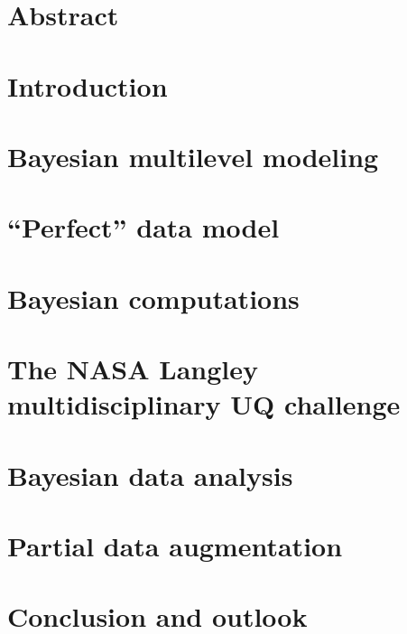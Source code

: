 \begin{refsection}

\section*{Abstract}


\section{Introduction} \label{sec:JAIS:Introduction}


\section{Bayesian multilevel modeling} \label{sec:JAIS:Multilevel}


\section{``Perfect'' data model} \label{sec:JAIS:PerfectData}


\section{Bayesian computations} \label{sec:JAIS:Computation}


\section{The NASA Langley multidisciplinary UQ challenge} \label{sec:JAIS:Challenge}


\section{Bayesian data analysis} \label{sec:JAIS:Analysis}


\section{Partial data augmentation} \label{sec:JAIS:Augmentation}


\section{Conclusion and outlook} \label{sec:JAIS:Conclusion}


\printbibliography[heading=subbibliography]
\end{refsection}